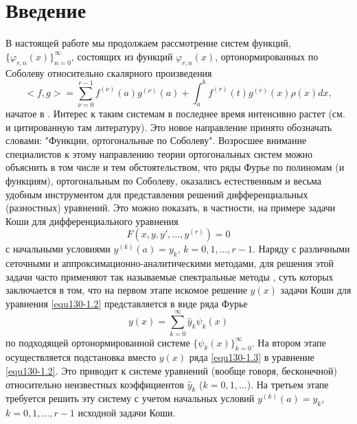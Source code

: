 \section{Введение}
В настоящей работе мы продолжаем  рассмотрение систем функций,
$\{ \varphi_{r,n}(x)\}_{n=0}^\infty$, состоящих из функций $\varphi_{r,n}(x)$, ортонормированных по Соболеву относительно скалярного произведения
\begin{equation}\label{equ130-1.1}
<f,g>=\sum_{\nu=0}^{r-1}f^{(\nu)}(a)g^{(\nu)}(a)+\int_{a}^{b}f^{(r)}(t)g^{(r)}(x)\rho(x)dx,
\end{equation}
начатое в \cite{equ130-Shar20}.   Интерес к таким системам  в последнее время интенсивно растет  
(см. \cite{equ130-Shar2016,equ130-IserKoch,equ130-MarcelAlfaroRezola,equ130-Meijer,equ130-KwonLittl1,equ130-Lopez1995,equ130-KwonLittl2,equ130-MarcelXu,equ130-Shar17,equ130-Shar13} и цитированную там литературу). Это новое направление принято обозначать словами: "Функции, ортогональные по Соболеву". Возросшее  внимание специалистов  к этому направлению теории ортогональных систем можно объяснить в том числе и тем обстоятельством, что ряды Фурье по полиномам (и функциям), ортогональным по Соболеву, оказались естественным и весьма удобным инструментом для представления решений  дифференциальных (разностных) уравнений. Это можно показать, в частности, на примере  задачи Коши для  дифференциального уравнения
\begin{equation}\label{equ130-1.2}
F(x,y,y',\ldots,y^{(r)})=0
 \end{equation}
с начальными условиями $y^{(k)}(a)=y_k$, $k=0,1,\ldots,r-1$.  Наряду с различными сеточными и аппроксимационно-аналитическими методами, для решения этой задачи часто применяют так называемые спектральные методы \cite{equ130-Tref1,equ130-Tref2,equ130-SolDmEg,equ130-Pash,equ130-Arush2014,equ130-Lukom2016,equ130-MMG2016,
equ130-DiffUr2017,equ130-Shar18}, суть которых  заключается в том, что на первом этапе искомое решение $y(x)$ задачи Коши для уравнения \eqref{equ130-1.2} представляется в виде ряда Фурье
\begin{equation}\label{equ130-1.3}
 y(x)=\sum_{k=0}^\infty \hat y_k\psi_k(x)
 \end{equation}
по подходящей ортонормированной системе $\{\psi_k(x)\}_{k=0}^\infty$. На втором этапе осуществляется подстановка вместо $y(x)$ ряда \eqref{equ130-1.3} в уравнение \eqref{equ130-1.2}. Это приводит к системе уравнений (вообще говоря, бесконечной) относительно неизвестных коэффициентов $\hat y_k$ ($k=0,1,\ldots$). На третьем этапе требуется решить эту систему с учетом начальных условий  $y^{(k)}(a)=y_k$, $k=0,1,\ldots,r-1$ исходной задачи Коши.
